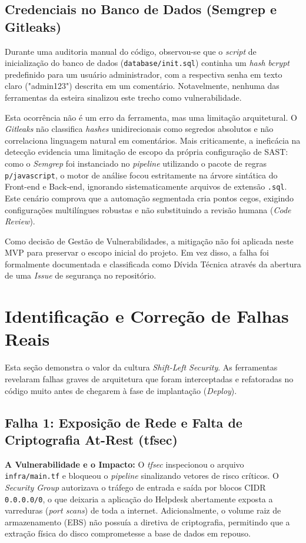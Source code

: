 \documentclass[12pt, a4paper]{article}
\begin{document}
\subsection{Credenciais no Banco de Dados (Semgrep e Gitleaks)}
Durante uma auditoria manual do código, observou-se que o \textit{script} de inicialização do banco de dados (\texttt{database/init.sql}) continha um \textit{hash} \textit{bcrypt} predefinido para um usuário administrador, com a respectiva senha em texto claro ("admin123") descrita em um comentário. Notavelmente, nenhuma das ferramentas da esteira sinalizou este trecho como vulnerabilidade.

Esta ocorrência não é um erro da ferramenta, mas uma limitação arquitetural. O \textit{Gitleaks} não classifica \textit{hashes} unidirecionais como segredos absolutos e não correlaciona linguagem natural em comentários. Mais criticamente, a ineficácia na detecção evidencia uma limitação de escopo da própria configuração de SAST: como o \textit{Semgrep} foi instanciado no \textit{pipeline} utilizando o pacote de regras \texttt{p/javascript}, o motor de análise focou estritamente na árvore sintática do Front-end e Back-end, ignorando sistematicamente arquivos de extensão \texttt{.sql}. Este cenário comprova que a automação segmentada cria pontos cegos, exigindo configurações multilíngues robustas e não substituindo a revisão humana (\textit{Code Review}).

Como decisão de Gestão de Vulnerabilidades, a mitigação não foi aplicada neste MVP para preservar o escopo inicial do projeto. Em vez disso, a falha foi formalmente documentada e classificada como Dívida Técnica através da abertura de uma \textit{Issue} de segurança no repositório.
\section{Identificação e Correção de Falhas Reais}

Esta seção demonstra o valor da cultura \textit{Shift-Left Security}. As ferramentas revelaram falhas graves de arquitetura que foram interceptadas e refatoradas no código muito antes de chegarem à fase de implantação (\textit{Deploy}).

\subsection{Falha 1: Exposição de Rede e Falta de Criptografia At-Rest (tfsec)}
\textbf{A Vulnerabilidade e o Impacto:} O \textit{tfsec} inspecionou o arquivo \texttt{infra/main.tf} e bloqueou o \textit{pipeline} sinalizando vetores de risco críticos. O \textit{Security Group} autorizava o tráfego de entrada e saída por blocos CIDR \texttt{0.0.0.0/0}, o que deixaria a aplicação do Helpdesk abertamente exposta a varreduras (\textit{port scans}) de toda a internet. Adicionalmente, o volume raiz de armazenamento (EBS) não possuía a diretiva de criptografia, permitindo que a extração física do disco comprometesse a base de dados em repouso. 
\end{document}
